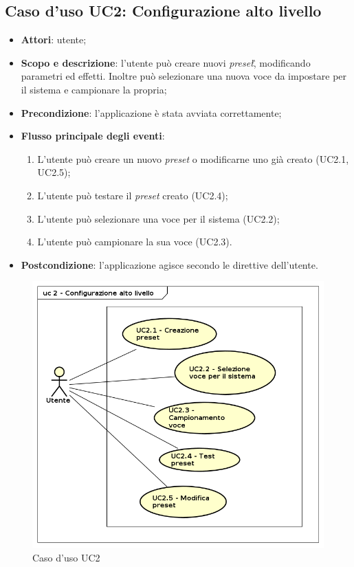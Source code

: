 \newpage

\subsection{Caso d'uso UC2: Configurazione alto livello}
\label{sec:UC2}

\begin{itemize}
\item \textbf{Attori}: utente;
\item \textbf{Scopo e descrizione}: l'utente può creare nuovi \textit{preset}\G, modificando parametri ed effetti.  Inoltre può selezionare una nuova voce da impostare per il sistema e campionare la propria;
\item \textbf{Precondizione}: l'applicazione è stata avviata correttamente;
\item \textbf{Flusso principale degli eventi}:
\begin{enumerate}
\item L'utente può creare un nuovo \textit{preset} o modificarne uno già creato (UC2.1, UC2.5);
\item L'utente può testare il \textit{preset} creato (UC2.4); 
\item L'utente può selezionare una voce per il sistema (UC2.2);
\item L'utente può campionare la sua voce (UC2.3).
\end{enumerate}
\item \textbf{Postcondizione}: l'applicazione agisce secondo le direttive dell'utente.
\end{itemize}
\begin{figure}[htbp]
\centering
\includegraphics[scale=0.5]{immagini/uc2_configurazione_alto_livello.png}
\captionsetup{labelfont=bf}
\caption{Caso d'uso UC2}
\end{figure}
\newpage


